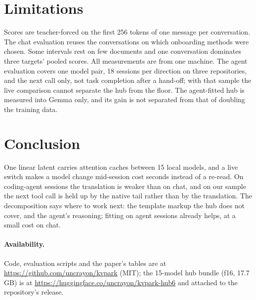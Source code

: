 \documentclass[11pt]{article}
\begin{document}
\section{Limitations}
Scores are teacher-forced on the first 256 tokens of one message per conversation. The chat
evaluation reuses the conversations on which onboarding methods were chosen. Some intervals rest
on few documents and one conversation dominates three targets' pooled scores. All measurements are
from one machine. The agent evaluation covers one model pair, 18 sessions per direction on three
repositories, and the next call only, not task completion after a hand-off; with that sample the live comparison
cannot separate the hub from the floor. The agent-fitted hub is measured into Gemma only, and its gain is not
separated from that of doubling the training data.

\section{Conclusion}
One linear latent carries attention caches between 15 local models, and a live switch makes a model change
mid-session cost seconds instead of a re-read. On coding-agent sessions the translation is weaker than on chat, and
on our sample the next tool call is held up by the native tail rather than by the translation. The decomposition says
where to work next: the template markup the hub does not cover, and the agent's reasoning; fitting on agent
sessions already helps, at a small cost on chat.

\paragraph{Availability.} Code, evaluation scripts and the paper's tables are at
\url{https://github.com/uncrayon/kvpark} (MIT); the 15-model hub bundle (f16, 17.7\,GB) is at \url{https://huggingface.co/uncrayon/kvpark-hub6} and attached
to the repository's release.



\end{document}
